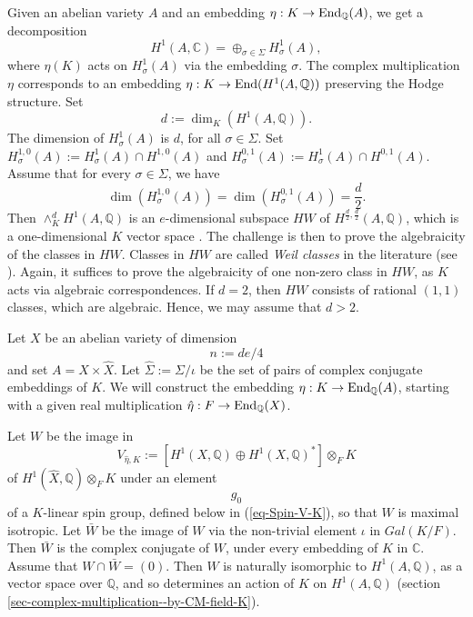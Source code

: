 \documentclass[12pt]{amsart}
\numberwithin{equation}{subsection}
\theoremstyle{plain}
\theoremstyle{definition}
\newcommand{\CC}{{\mathbb C}}
\newcommand{\QQ}{{\mathbb Q}}
\newcommand{\End}{{\rm End}}
\begin{document}
{Given an abelian variety $A$ and an embedding
$\eta:K\rightarrow \End_\QQ(A)$, we get a decomposition
\[
H^1(A,\CC)=\oplus_{\sigma\in\Sigma}H^1_\sigma(A),
\]
where $\eta(K)$ acts on $H^1_\sigma(A)$ via the embedding $\sigma$. The complex multiplication $\eta$ corresponds to an embedding $\eta:K\rightarrow \End(H^1(A,\QQ))$ preserving the Hodge structure.
Set 
\[
d:=\dim_K(H^1(A,\QQ)).
\] 
The dimension of $H^1_\sigma(A)$ is $d$, for all $\sigma\in \Sigma$. 
Set $H^{1,0}_\sigma(A):=H^1_\sigma(A)\cap H^{1,0}(A)$ and
$H^{0,1}_\sigma(A):=H^1_\sigma(A)\cap H^{0,1}(A)$. Assume that for every $\sigma\in\Sigma$, we have 
\begin{equation}
\label{eq-condition-for-HW-to-consist-of-Hodge-classes}
\dim(H^{1,0}_\sigma(A))=\dim(H^{0,1}_\sigma(A))=\frac{d}{2}.
\end{equation}
Then $\wedge_K^dH^1(A,\QQ)$ is an $e$-dimensional subspace $HW$ of $H^{\frac{d}{2},\frac{d}{2}}(A,\QQ)$, which is a one-dimensional $K$ vector space
\cite[Prop. 4.4]{deligne-milne}.
The challenge is then to prove the algebraicity of the classes in $HW$. Classes in $HW$ are called {\em Weil classes} in the literature (see \cite{Moonen-Zarhin-Weil-classes}).
Again, it suffices to prove the algebraicity of one non-zero class in $HW$,
as $K$ acts via algebraic correspondences. If $d=2$, then $HW$ consists of rational $(1,1)$ classes, which are algebraic.
Hence, we may assume that $d>2$.

Let $X$ be an abelian variety of dimension 
\[
n:=de/4
\] 
and set $A=X\times\hat{X}$. 
Let $\hat{\Sigma}:=\Sigma/\iota$ be the set of pairs of complex conjugate embeddings of $K$. 
We will construct the embedding $\eta:K\rightarrow \End_\QQ(A)$, 
starting with a given real multiplication $\hat{\eta}:F\rightarrow \End_\QQ(X)$.


Let $W$  be the image in 
\[
V_{\hat{\eta},K}:=[H^1(X,\QQ)\oplus H^1(X,\QQ)^*]\otimes_FK
\]
of $H^1(\hat{X},\QQ)\otimes_FK$ under an element 
\begin{equation}
\label{eq-g}
g_0
\end{equation} 
of a $K$-linear spin group, defined below in (\ref{eq-Spin-V-K}), so that $W$ is maximal isotropic.
Let $\bar{W}$ be the image of $W$ via the non-trivial element $\iota$ in $Gal(K/F)$. 
Then $\bar{W}$ is the complex conjugate of $W$, under every embedding of $K$ in $\CC$. Assume that $W\cap\bar{W}=(0)$. Then $W$ is naturally isomorphic to 
$H^1(A,\QQ)$, as a vector space over $\QQ$, and so determines an action of $K$ on $H^1(A,\QQ)$ (section \ref{sec-complex-multiplication--by-CM-field-K}).


}
\end{document}
